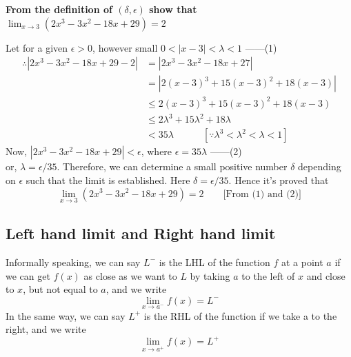 \documentclass[12pt]{article}
\begin{document}
\begin{example}{\textbf{From the definition of $(\delta,\epsilon)$ show that $\lim_{x \to 3} (2x^3-3x^2-18x+29)=2$}}

    Let for a given $\epsilon>0$, however small $0<|x-3|<\lambda<1$ ------(1)
    \begin{align*}
        \therefore |2x^3-3x^2-18x+29 - 2| &= |2x^3-3x^2-18x+27| \\
        &= |2(x-3)^3 + 15(x-3)^2 + 18(x-3)| \\
        &\le 2(x-3)^3 + 15(x-3)^2 + 18(x-3) \\
        &\le 2\lambda^3 + 15\lambda^2 + 18\lambda \\
        &< 35\lambda \quad\quad\quad [ \because \lambda^3<\lambda^2<\lambda<1 ]
    \end{align*}
    Now, $|2x^3-3x^2-18x+29|<\epsilon$, where $\epsilon=35\lambda$ ------(2) \\
    or, $\lambda=\epsilon/35$. Therefore, we can determine a small positive number $\delta$ depending on $\epsilon$ such that the limit is established. Here $\delta=\epsilon/35$. Hence it's proved that \[
        \lim_{x \to 3} (2x^3-3x^2-18x+29) = 2 \quad\quad \text{[From (1) and (2)]}
    \]
\end{example}


    
\subsection{Left hand limit and Right hand limit}

Informally speaking, we can say $L^-$ is the LHL of the function $f$ at a point $a$ if we can get $f(x)$ as close as we want to $L$ by taking $a$ to the left of $x$ and close to $x$, but not equal to $a$, and we write \[
    \lim_{x \to a^-} f(x) = L^-
    \] In the same way, we can say $L^+$ is the RHL of the function if we take a to the right, and we write \[
    \lim_{x \to a^+} f(x) = L^+
\]
\end{document}
